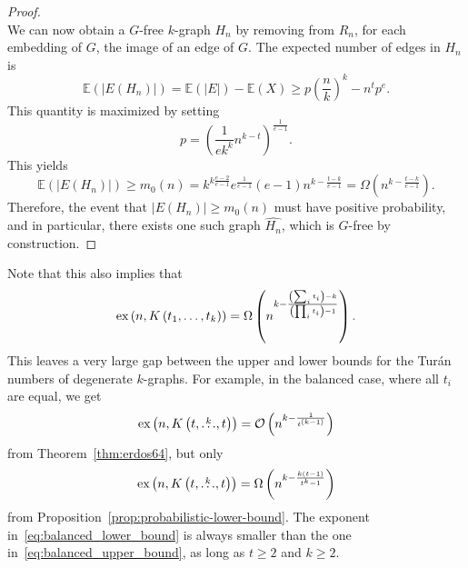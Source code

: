 \begin{proposition}
\begin{proof}
\[        \]
        We can now obtain a $G$-free $k$-graph $H_n$ by removing from $R_n$, for each embedding of $G$,
        the image of an edge of $G$.
        The expected number of edges in $H_n$ is
        \[
            \mathbb{E}(|E(H_n)|) = \mathbb{E}(|E|) - \mathbb{E}(X) \geq
            p \left( \frac{n}{k} \right)^k - n^t p^{e}.
        \]
        This quantity is maximized by setting
        \[
            p = \left( \frac{1}{ek^k} n^{k-t} \right)^{\frac{1}{e-1}}.
        \]
        This yields
        \[
            \mathbb{E}(|E(H_n)|) \geq
            m_0(n) =
            k^{k \frac{e-2}{e-1}} e^{\frac{1}{e-1}}(e-1) n^{k - \frac{t-k}{e-1}}
            = \Omega\left(n^{k - \frac{t-k}{e-1}} \right).
        \]
        Therefore, the event that $|E(H_n)| \geq m_0(n)$
        must have positive probability, and in particular,
        there exists one such graph $\widehat{H_n}$, which is $G$-free by construction.

    \end{proof}

\end{proposition}

Note that this also implies that
\[
    \text{ex} \left( n, K\left(t_1, \dots, t_k\right) \right) = \Omega\left(n^{k - \frac{\left( \sum_i t_i \right) - k}{\left( \prod_i t_i \right) - 1}}\right).
\]
This leaves a very large gap between the upper and lower bounds for the Turán numbers of degenerate $k$-graphs.
For example, in the balanced case, where all $t_i$ are equal, we get
\begin{equation} \label{eq:balanced_upper_bound}
    \text{ex} \left( n, K\left(t, \overset{k}{\dots}, t\right) \right) = \mathcal{O}\left(n^{k - \frac{1}{t^{(k-1)}}}\right)
\end{equation}
from Theorem~\ref{thm:erdos64}, but only
\begin{equation} \label{eq:balanced_lower_bound}
    \text{ex} \left( n, K\left(t, \overset{k}{\dots}, t\right) \right) = \Omega\left(n^{k - \frac{k(t-1)}{t^k - 1}}\right)
\end{equation}
from Proposition~\ref{prop:probabilistic-lower-bound}.
The exponent in~\eqref{eq:balanced_lower_bound} is always
smaller than the one in~\eqref{eq:balanced_upper_bound},
as long as $t \geq 2$ and $k \geq 2$.

